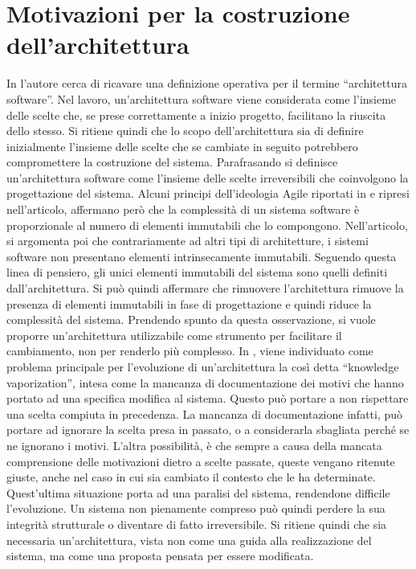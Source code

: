 \documentclass[12pt]{report}
\begin{document}
\section{Motivazioni per la costruzione dell'architettura}
In \cite{whoneedsanArchitect} l'autore cerca di ricavare una definizione operativa per il termine ``architettura software''. 
Nel lavoro, un'architettura software viene considerata come l'insieme delle scelte che, se prese correttamente a inizio progetto, facilitano la riuscita dello stesso.
Si ritiene quindi che lo scopo dell'architettura sia di definire inizialmente l'insieme delle scelte che se cambiate in seguito potrebbero compromettere la costruzione del sistema.
Parafrasando si definisce un'architettura software come l'insieme delle scelte irreversibili che coinvolgono la progettazione del sistema.
Alcuni principi dell'ideologia Agile riportati in \cite{martin_fowler_xp_2002} e ripresi nell'articolo, affermano però che la complessità di un sistema software è proporzionale al numero di elementi immutabili che lo compongono.
Nell'articolo, si argomenta poi che contrariamente ad altri tipi di architetture, i sistemi software non presentano elementi intrinsecamente immutabili. 
Seguendo questa linea di pensiero, gli unici elementi immutabili del sistema sono quelli definiti dall'architettura.
Si può quindi affermare che rimuovere l'architettura rimuove la presenza di elementi immutabili in fase di progettazione e quindi riduce la complessità del sistema.
Prendendo spunto da questa osservazione, si vuole proporre un'architettura utilizzabile come strumento per facilitare il cambiamento, non per renderlo più complesso. 
In \cite{designChoiche}, viene individuato come problema principale per l'evoluzione di un'architettura la così detta ``knowledge vaporization'', intesa come la mancanza di documentazione dei motivi che hanno portato ad una specifica modifica al sistema. %
Questo può portare a non rispettare una scelta compiuta in precedenza. 
La mancanza di documentazione infatti, può portare ad ignorare la scelta presa in passato, o a considerarla sbagliata perché se ne ignorano i motivi.  
L'altra possibilità, è che sempre a causa della mancata comprensione delle motivazioni dietro a scelte passate, queste vengano ritenute giuste, anche nel caso in cui sia cambiato il contesto che le ha determinate.
Quest'ultima situazione porta ad una paralisi del sistema, rendendone difficile l'evoluzione.
Un sistema non pienamente compreso può quindi perdere la sua integrità strutturale o diventare di fatto irreversibile.
Si ritiene quindi che sia necessaria un'architettura, vista non come una guida alla realizzazione del sistema, ma come una proposta pensata per essere modificata. 
\end{document}
